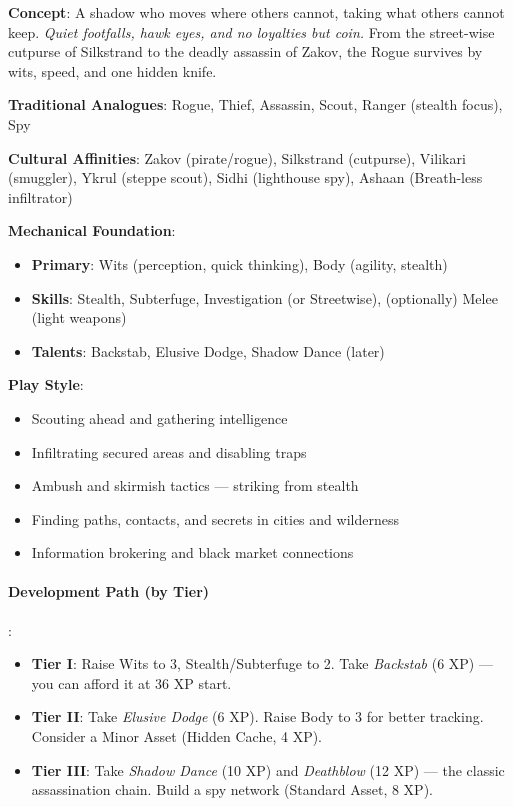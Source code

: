 \textbf{Concept}: A shadow who moves where others cannot, taking what others cannot keep. \emph{Quiet footfalls, hawk eyes, and no loyalties but coin.} From the street-wise cutpurse of Silkstrand to the deadly assassin of Zakov, the Rogue survives by wits, speed, and one hidden knife.

\textbf{Traditional Analogues}: Rogue, Thief, Assassin, Scout, Ranger (stealth focus), Spy

\textbf{Cultural Affinities}: Zakov (pirate/rogue), Silkstrand (cutpurse), Vilikari (smuggler), Ykrul (steppe scout), Sidhi (lighthouse spy), Ashaan (Breath-less infiltrator)

\textbf{Mechanical Foundation}:
\begin{itemize}
\item \textbf{Primary}: Wits (perception, quick thinking), Body (agility, stealth)
\item \textbf{Skills}: Stealth, Subterfuge, Investigation (or Streetwise), (optionally) Melee (light weapons)
\item \textbf{Talents}: Backstab, Elusive Dodge, Shadow Dance (later)
\end{itemize}

\textbf{Play Style}:
\begin{itemize}
\item Scouting ahead and gathering intelligence
\item Infiltrating secured areas and disabling traps
\item Ambush and skirmish tactics --- striking from stealth
\item Finding paths, contacts, and secrets in cities and wilderness
\item Information brokering and black market connections
\end{itemize}

\paragraph{Development Path (by Tier)}:
\begin{itemize}
\item \textbf{Tier I}: Raise Wits to 3, Stealth/Subterfuge to 2. Take \emph{Backstab} (6 XP) --- you can afford it at 36 XP start.
\item \textbf{Tier II}: Take \emph{Elusive Dodge} (6 XP). Raise Body to 3 for better tracking. Consider a Minor Asset (Hidden Cache, 4 XP).
\item \textbf{Tier III}: Take \emph{Shadow Dance} (10 XP) and \emph{Deathblow} (12 XP) --- the classic assassination chain. Build a spy network (Standard Asset, 8 XP).
\end{itemize}

